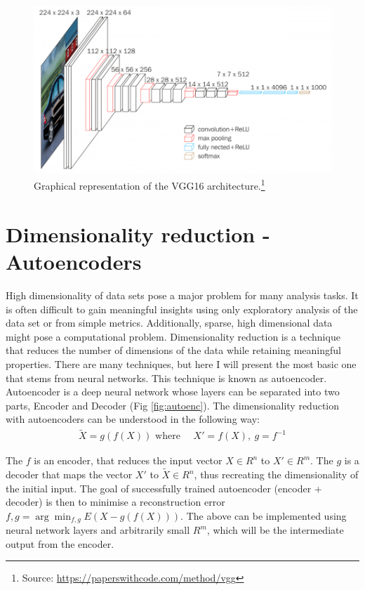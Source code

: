 \begin{figure}
  \centering
  \includegraphics[width=0.9\linewidth]{figures/chapter3/vgg16.png}
  \caption[gvgg16]{Graphical representation of the VGG16 architecture.\footnote{Source: \url{https://paperswithcode.com/method/vgg}}}
  \label{fig:vgg16}
\end{figure}

\section{Dimensionality reduction - Autoencoders}

High dimensionality of data sets pose a major problem for many analysis tasks.
It is often difficult to gain meaningful insights using only exploratory analysis of the data set or from simple metrics.
Additionally, sparse, high dimensional data might pose a computational problem.
Dimensionality reduction is a technique that reduces the number of dimensions of the data while retaining meaningful properties.
There are many techniques, but here I will present the most basic one that stems from neural networks.
This technique is known as autoencoder.
Autoencoder is a deep neural network whose layers can be separated into two parts, Encoder and Decoder (Fig \ref{fig:autoenc}).
The dimensionality reduction with autoencoders can be understood in the following way:
\begin{align*}
\tilde{X} = g(f(X))  \text{ where } \quad X\prime = f(X),\ g = f^{-1}
\end{align*}

The $f$ is an encoder, that reduces the input vector $X \in R^{n}$ to $X' \in R^{m}$.
The $g$ is a decoder that maps the vector $X'$ to $\tilde{X} \in R^{n}$, thus recreating the dimensionality of the initial input.
The goal of successfully trained autoencoder (encoder + decoder) is then to minimise a reconstruction error $f,g = \arg\min_{f,g} E(X-g(f(X)))$.
The above can be implemented using neural network layers and arbitrarily small $R^{m}$, which will be the intermediate output from the encoder.

